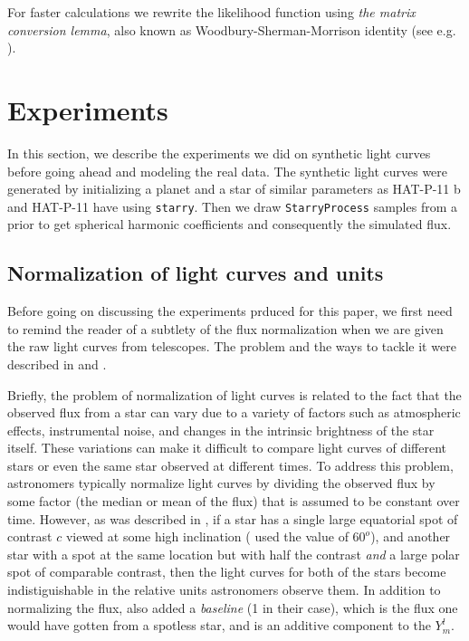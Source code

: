 \documentclass[twocolumn]{aastex631}
\begin{document}
For faster calculations we rewrite the likelihood function using \emph{the matrix conversion lemma}, also known as 
Woodbury-Sherman-Morrison identity (see e.g. \cite{Hogg2020}).


\section{Experiments}
In this section, we describe the experiments we did on synthetic light curves before going ahead and modeling the real data. The synthetic light curves were 
generated by initializing a planet and a star of similar parameters as HAT-P-11 b and HAT-P-11 have using \texttt{starry}. Then we draw \texttt{StarryProcess} 
samples from a prior to get spherical harmonic coefficients and consequently the simulated flux. 

\subsection{Normalization of light curves and units}
Before going on discussing the experiments prduced for this paper, we first need to remind the reader of a subtlety of the flux normalization when we are given
the raw light curves from telescopes. The problem and the ways to tackle it were described in \cite{Luger2021a} and \cite{Luger2021b}. 

Briefly, the problem of normalization of light curves is related to the fact that the observed flux from a star can vary due to a variety of factors 
such as atmospheric effects, instrumental noise, and changes in the intrinsic brightness of the star itself. These variations can make it difficult 
to compare light curves of different stars or even the same star observed at different times. To address this problem, astronomers typically normalize 
light curves by dividing the observed flux by some factor (the median or mean of the flux) that is assumed to be constant over time. 
However, as was described in \cite{Luger2021a}, if a star has a single large equatorial spot of contrast $c$ viewed at some high inclination 
(\cite{Luger2021a} used the value of $60^o$), and another star with a spot at the same location but with half the contrast \emph{and} a large polar spot of 
comparable contrast, then the light curves for both of the stars become indistiguishable in the relative units astronomers observe them. In addition to normalizing 
the flux, \cite{Luger2021a} also added a \emph{baseline} (1 in their case), which is the flux one would have gotten from a spotless star, 
and is an additive component to the $Y_m^l$.
\end{document}
